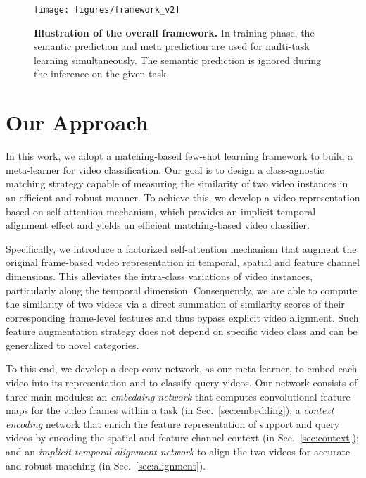 \documentclass{article}
\begin{document}
\begin{figure*}
    \centering
    \texttt{[image: figures/framework\_v2]}
\caption{\textbf{Illustration of the overall framework.} In training phase, the semantic prediction and meta prediction are used for multi-task learning simultaneously. The semantic prediction is ignored during the inference on the given task. }\vspace{-3mm}
    \label{fig:overview}
\end{figure*}


\section{Our Approach}\label{sec:method}
In this work, we adopt a matching-based few-shot learning framework to build a meta-learner  for video classification. Our goal is to design a class-agnostic matching strategy capable of measuring the similarity of two video instances in an efficient and robust manner. To achieve this, we develop a video representation based on self-attention mechanism, which provides an implicit temporal alignment effect and yields an efficient matching-based video classifier. 

Specifically, we introduce a factorized self-attention mechanism that augment the original frame-based video representation in temporal, spatial and feature channel dimensions. This alleviates the intra-class variations of video instances, particularly along the temporal dimension. Consequently, we are able to compute the similarity of two videos via a direct summation of similarity scores of their corresponding frame-level features and thus bypass explicit video alignment. Such feature augmentation strategy does not depend on specific video class and can be generalized to novel categories.   



To this end, we develop a deep conv network, as our meta-learner, to embed each video into its representation and to classify query videos. 
Our network consists of three main modules: an \textit{embedding network} that computes convolutional feature maps for the video frames within a task (in Sec.~\ref{sec:embedding}); a \textit{context encoding} network that enrich the feature representation of support and query videos by encoding the spatial and feature channel context (in Sec.~\ref{sec:context}); and an \textit{implicit temporal alignment network} to align the two videos for accurate and robust matching (in Sec.~\ref{sec:alignment}).
\end{document}
